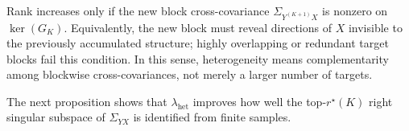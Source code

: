 
\begin{remark}
\label{rem:heterogeneity_interpretation}
Rank increases only if the new block cross-covariance $\Sigma_{Y^{(K+1)}X}$ is nonzero on $\ker(G_K)$. 
Equivalently, the new block must reveal directions of $X$ invisible to the previously accumulated structure; highly overlapping or redundant target blocks fail this condition. 
In this sense, heterogeneity means complementarity among blockwise cross-covariances, not merely a larger number of targets.
\end{remark}







The next proposition shows that $\lambda_{\mathrm{het}}$ improves how well the top-$r^\star(K)$ right singular subspace of $\Sigma_{YX}$ is identified from finite samples.

